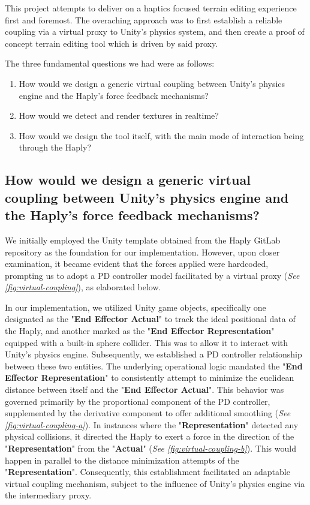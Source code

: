 This project attempts to deliver on a haptics focused terrain editing experience first and foremost. The overaching approach was to first establish a reliable coupling via a virtual proxy to Unity's physics system, and then create a proof of concept terrain editing tool which is driven by said proxy.

The three fundamental questions we had were as follows:

\begin{enumerate}
    \item How would we design a generic virtual coupling between Unity's physics engine and the Haply's force feedback mechanisms?
    \item How would we detect and render textures in realtime?
    \item How would we design the tool itself, with the main mode of interaction being through the Haply?
\end{enumerate}

\subsection{How would we design a generic virtual coupling between Unity's physics engine and the Haply's force feedback mechanisms?} \label{subsec:virtual-coupling}

We initially employed the Unity template obtained from the Haply GitLab repository as the foundation for our implementation. However, upon closer examination, it became evident that the forces applied were hardcoded, prompting us to adopt a PD controller model \cite{mathworksPID} facilitated by a virtual proxy (\textit{See \ref*{fig:virtual-coupling}}), as elaborated below.

In our implementation, we utilized Unity game objects, specifically one designated as the "\textbf{End Effector Actual}" to track the ideal positional data of the Haply, and another marked as the "\textbf{End Effector Representation}" equipped with a built-in sphere collider. This was to allow it to interact with Unity's physics engine. Subsequently, we established a PD controller relationship between these two entities. The underlying operational logic mandated the "\textbf{End Effector Representation}" to consistently attempt to minimize the euclidean distance between itself and the "\textbf{End Effector Actual}". This behavior was governed primarily by the proportional component of the PD controller, supplemented by the derivative component to offer additional smoothing (\textit{See \ref*{fig:virtual-coupling-a}}). In instances where the "\textbf{Representation}" detected any physical collisions, it directed the Haply to exert a force in the direction of the "\textbf{Representation}" from the "\textbf{Actual}" (\textit{See \ref*{fig:virtual-coupling-b}}). This would happen in parallel to the distance minimization attempts of the "\textbf{Representation}". Consequently, this establishment facilitated an adaptable virtual coupling mechanism, subject to the influence of Unity's physics engine via the intermediary proxy.

